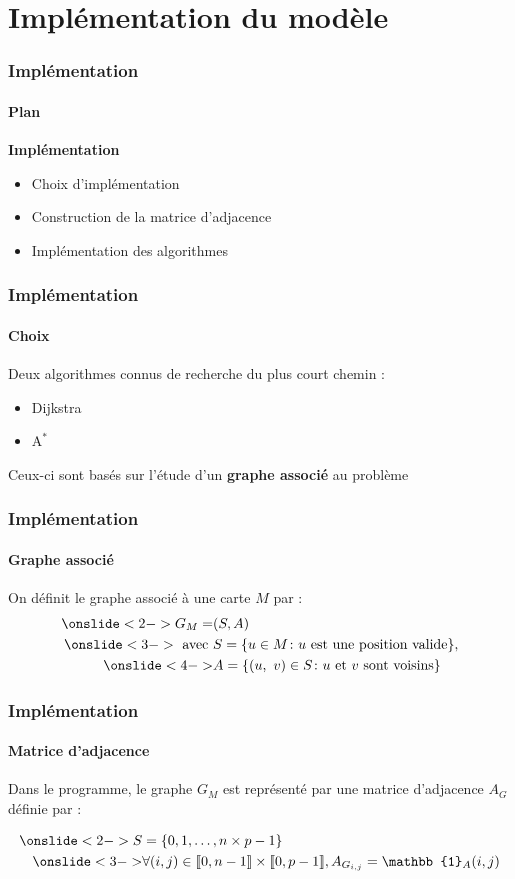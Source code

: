 \section{Implémentation du modèle}

\begin{frame}

    \frametitle{Implémentation}
    \framesubtitle{Plan}
    \textbf{Implémentation}
    \begin{itemize}
        \item <2-> Choix d'implémentation
        \item <3-> Construction de la matrice d'adjacence
        \item <4-> Implémentation des algorithmes
    \end{itemize}
\end{frame}


\begin{frame}
    \frametitle{Implémentation}
    \framesubtitle{Choix}
    Deux algorithmes connus de recherche du plus court chemin :
    \begin{itemize}
        \item <2-> Dijkstra
        \item <3-> $\text{A}^{*}$
    \end{itemize}
    \bigskip
    Ceux-ci sont basés sur l'étude d'un \textbf{graphe associé} au problème
\end{frame}


\begin{frame}
    \frametitle{Implémentation}
    \framesubtitle{Graphe associé}
    On définit le graphe associé à une carte $M$ par :
    \bigskip
    \begin{align*}
        \onslide<2-> G_M =         & (S, A)                                                           \\
        \onslide<3-> \text{ avec } & S = \{u \in M \colon u \text{ est une position valide}\},        \\
        \onslide<4->               & A = \{(u,\ v)\in S \colon u \text{ et } v \text{ sont voisins}\}
    \end{align*}

\end{frame}


\begin{frame}
    \frametitle{Implémentation}
    \framesubtitle{Matrice d'adjacence}

    Dans le programme, le graphe $G_M$ est représenté par une matrice d'adjacence $A_G$ définie par :

    \begin{align*}
        \onslide<2-> S & = \{0, 1, \dots, n \times p - 1 \}                                                                                        \\
        \bigskip
        \onslide<3->   & \forall (i,j)\in \llbracket 0, n-1\rrbracket \times \llbracket 0, p-1\rrbracket,\space A_{G_{i,j}} = \mathbb{1}_{A} (i,j)
    \end{align*}
\end{frame}


